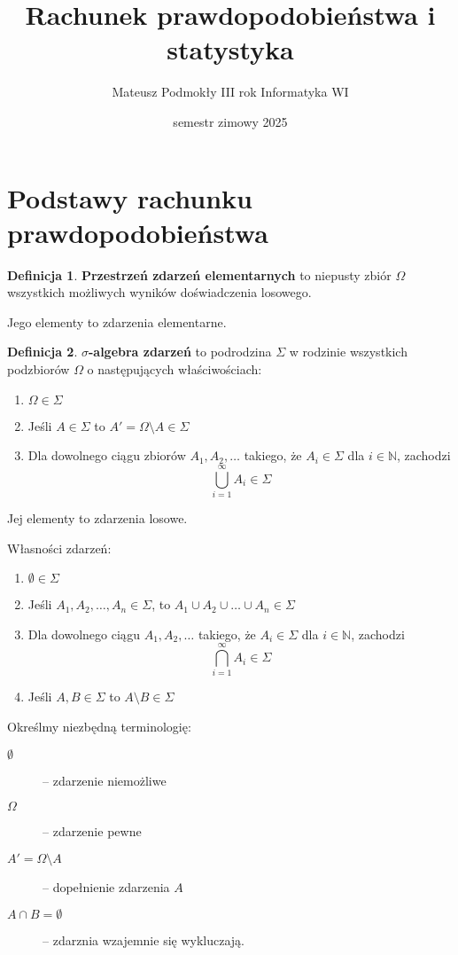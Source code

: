 \documentclass[11pt, leqno]{scrartcl}
\title{Rachunek prawdopodobieństwa i statystyka}
\author{Mateusz Podmokły III rok Informatyka WI}
\date{semestr zimowy 2025}
\theoremstyle{definition}
\newtheorem{definition}{Definicja}[section]
\begin{document}
    \maketitle
    \section{Podstawy rachunku prawdopodobieństwa}
    \begin{definition}
        \textbf{Przestrzeń zdarzeń elementarnych} to niepusty zbiór
        $\Omega$ wszystkich możliwych wyników doświadczenia losowego.
    \end{definition}
    \noindent
    Jego elementy to zdarzenia elementarne.
    \begin{definition}
        \textbf{$\sigma$-algebra zdarzeń} to podrodzina $\Sigma$
        w rodzinie wszystkich podzbiorów $\Omega$ o następujących
        właściwościach:
        \begin{enumerate}
            \item $\Omega \in \Sigma$
            \item Jeśli $A \in \Sigma$ to $A'=\Omega \setminus A \in
                \Sigma$
            \item Dla dowolnego ciągu zbiorów $A_1,A_2,\dots$ takiego,
                że $A_i \in \Sigma$ dla $i \in \mathbb{N}$, zachodzi
                \[
                    \bigcup_{i=1}^{\infty}A_i \in \Sigma
                \]
        \end{enumerate}
        Jej elementy to zdarzenia losowe.
    \end{definition}
    \noindent
    Własności zdarzeń:
    \begin{enumerate}
        \item $\emptyset \in \Sigma$
        \item Jeśli $A_1,A_2,\dots,A_n \in \Sigma$, to
            $A_1 \cup A_2 \cup \dots \cup A_n \in \Sigma$
        \item Dla dowolnego ciągu $A_1,A_2,\dots$ takiego, że
            $A_i \in \Sigma$ dla $i \in \mathbb{N}$, zachodzi
            \[
                \bigcap_{i=1}^{\infty}A_i \in \Sigma
            \]
        \item Jeśli $A,B \in \Sigma$ to $A \setminus B \in \Sigma$
    \end{enumerate}
    Określmy niezbędną terminologię:
    \begin{description}
        \item[$\emptyset$] -- zdarzenie niemożliwe
        \item[$\Omega$] -- zdarzenie pewne
        \item[$A'=\Omega \setminus A$] -- dopełnienie zdarzenia $A$
        \item[$A \cap B= \emptyset$] -- zdarznia wzajemnie się
            wykluczają.
    \end{description}
\end{document}
